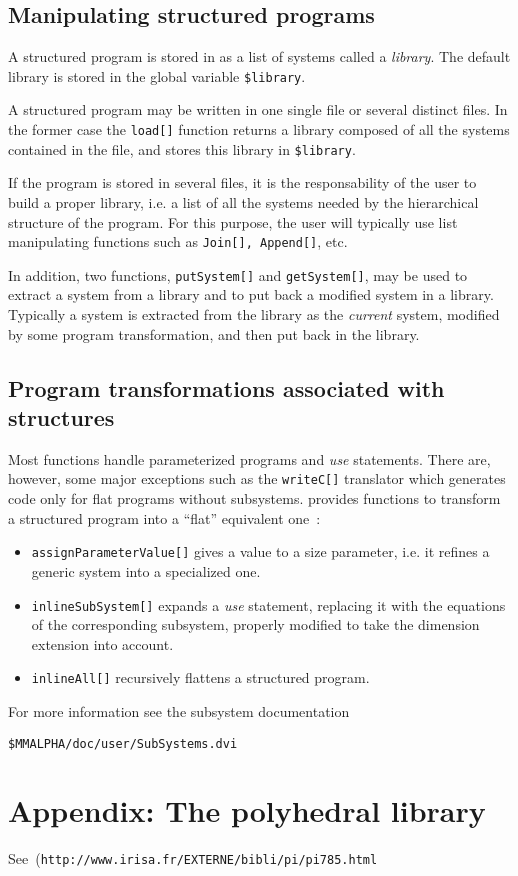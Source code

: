 \subsection{Manipulating structured programs}

A structured program is stored in {\mmalfa{}} as a {\mma{}} list of
systems called a \emph{library}. The default library is stored in the
global variable \verb!$library!.

A structured program may be written in one single file or several
distinct files.  In the former case the \texttt{load[]} function
returns a library composed of all the systems contained in the file,
and stores this library in \verb!$library!. %

If the program is stored in several files, it is the responsability of
the user to build a proper library, i.e. a {\mmalfa{}} list of all the
systems needed by the hierarchical structure of the program. For this
purpose, the user will typically use {\mmalfa{}} list manipulating
functions such as \texttt{Join[], Append[]}, etc.

In addition, two functions, \texttt{putSystem[]} and
\texttt{getSystem[]}, may be used to extract a system from a library
and to put back a modified system in a library. Typically a
system is extracted from the library as the {\em current}
system, modified by some program
transformation, and then put back in the library.\index{\getSystem[]}

\subsection{Program transformations associated with structures}

Most \mmalfa{} functions handle parameterized programs and \emph{use}
statements. There are, however, some major exceptions such as the
\texttt{writeC[]} translator  which generates code
only for flat {\Alpha} programs without subsystems. 
\mmalfa{}
provides functions to transform a structured program
into a ``flat'' equivalent one~:

\begin{itemize}
\item \texttt{assignParameterValue[]} 
gives a value to a size parameter, i.e. it refines a generic system
into a specialized one.
\item \texttt{inlineSubSystem[]}  expands a
\emph{use} statement, replacing it with the equations of the
corresponding subsystem, properly modified to take the dimension
extension into account.
\item \texttt{inlineAll[]}  recursively flattens a
structured {\alfa} program.
\end{itemize}
For more information see 
the subsystem documentation
\begin{verbatim}
$MMALPHA/doc/user/SubSystems.dvi
\end{verbatim}

\section*{Appendix: The polyhedral library}
\label{polylib}
See~\cite{Wilde93}(\texttt{http://www.irisa.fr/EXTERNE/bibli/pi/pi785.html}


